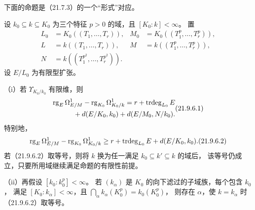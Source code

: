 下面的命题是（21.7.3）的一个“形式”对应。

设 $k_0\subseteq k\subseteq K_0$ 为三个特征 $p>0$ 的域，且 $[K_0:k]<\infty$。
置
\[
\begin{aligned}
 L_0&=K_0((T_1,\ldots,T_r)),&
 M_0&=K_0((T_1^p,\ldots,T_r^p)),\\
 L&=k((T_1,\ldots,T_r)),&
 M&=k((T_1^p,\ldots,T_r^p)),\\
 N&=k((T_1^{p^2},\ldots,T_r^{p^2})).
\end{aligned}
\]
设 $E/L_0$ 为有限型扩张。

（i）若 $\Upsilon_{K_0/k_0}$ 有限维，则
\begin{equation}
\begin{split}
 \rk_E\Omega^1_{E/M}-\rk_{K_0}\Omega^1_{K_0/k}
 =r+\trdeg_{L_0}E\qquad\qquad\\
 {}+d(E/K_0,k_0)+d(E/M_0,N/k_0).
\end{split}\tag{21.9.6.1}
\end{equation}
特别地，
\begin{equation}
 \rk_E\Omega^1_{E/M}-\rk_{K_0}\Omega^1_{K_0/k}
 \ge r+\trdeg_{L_0}E+d(E/K_0,k_0).
 \tag{21.9.6.2}
\end{equation}
若（21.9.6.2）取等号，则将 $k$ 换为任一满足 $k_0\subseteq k'\subseteq k$ 的域后，
该等号仍成立，只要所用域继续满足命题的有限性前提。

（ii）再假设 $[k_0:k_0^p]<\infty$。
若 $(k_\alpha)$ 是 $K_0$ 的向下滤过的子域族，每个包含 $k_0$，
满足 $[K_0:k_\alpha]<\infty$，且
$\bigcap_\alpha k_\alpha(K_0^p)=k_0(K_0^p)$，
则存在 $\alpha$，使 $k=k_\alpha$ 时（21.9.6.2）取等号。

